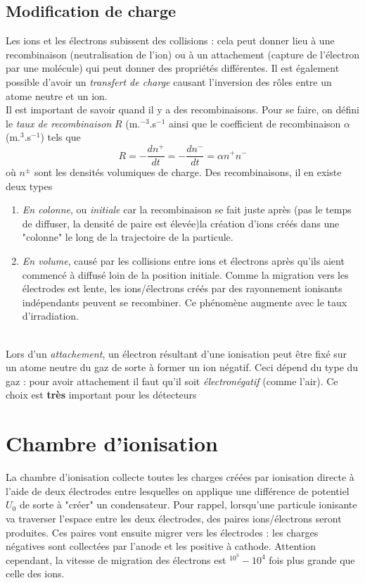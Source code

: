 	\subsection{Modification de charge}%
	Les ions et les électrons subissent des collisions : cela peut donner lieu à une recombinaison
	(neutralisation de l'ion) ou à un attachement (capture de l'électron par une molécule) qui 
	peut donner des propriétés différentes. Il est également possible d'avoir un \textit{transfert 
	de charge} causant l'inversion des rôles entre un atome neutre et un ion.\\
	
	Il est important de savoir quand il y a des recombinaisons. Pour se faire, on défini le 
	\textit{taux de recombinaison} $R$ (m.$^{-3}$.s$^{-1}$ ainsi que le coefficient de 
	recombinaison $\alpha$ (m.$^3$.s$^{-1}$) tels que
	\begin{equation}
	R=-\frac{dn^+}{dt}=-\frac{dn^-}{dt}=\alpha n^+n^-
	\end{equation}
	où $n^\pm$ sont les densités volumiques de charge. Des recombinaisons, il en existe deux 
	types
	\begin{enumerate}
	\item \textit{En colonne}, ou \textit{initiale} car la recombinaison se fait juste après 
	(pas le temps de diffuser, la densité de paire est élevée)la création d'ions créés dans une
	"colonne" le long de la trajectoire de la particule.
	\item \textit{En volume}, causé par les collisions entre ions et électrons après qu'ils 
	aient commencé à diffusé loin de la position initiale.  Comme la migration vers les électrodes
	est lente, les ions/électrons créés par des rayonnement ionisants indépendants peuvent se 
	recombiner. Ce phénomène augmente avec le taux d'irradiation.
	\end{enumerate}\ \\
	
	Lors d'un \textit{attachement}, un électron résultant d'une ionisation peut être fixé sur un 
	atome neutre du gaz de sorte à former un ion négatif. Ceci dépend du type du gaz : pour avoir
	attachement il faut qu'il soit \textit{électronégatif} (comme l'air). Ce choix est \textbf{très}
	important pour les détecteurs
	
\section{Chambre d'ionisation} %
La chambre d'ionisation collecte toutes les charges créées par ionisation directe à l'aide de deux
électrodes entre lesquelles on applique une différence de potentiel $U_0$ de sorte à "créer" un 
condensateur. Pour rappel, lorsqu'une particule ionisante va traverser l'espace entre les deux
électrodes, des paires ions/électrons seront produites. Ces paires vont ensuite migrer vers les 
électrodes : les charges négatives sont collectées par l'anode et les positive à cathode. Attention
cependant, la vitesse de migration des électrons est $^10^3-10^4$ fois plus grande que celle des
ions.
	

